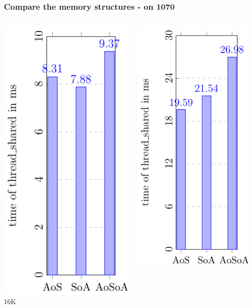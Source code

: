 \documentclass[aspectratio=169]{beamer}
\begin{document}
\begin{frame}
	\frametitle{Compare the memory structures - on 1070}
	\begin{columns}
	\begin{column}{0.25\textwidth}
	\includegraphics[scale=0.55]{figures/fig100.pdf}
	\small 16K
	\end{column}
	\begin{column}{0.25\textwidth}
	\includegraphics[scale=0.55]{figures/fig200.pdf}

\end{column}
\end{columns}
\end{frame}
\end{document}
